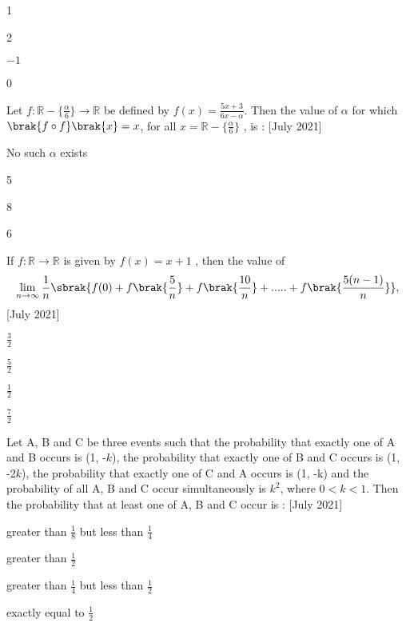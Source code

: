  \begin{enumerate}
 \begin{multicols}{2}
      \item 1
      \item 2
      \item  $-1$
      \item 0
 \end{multicols}
  \end{enumerate}
  \item Let $f : \mathbb{R} - \{ \frac{\alpha}{6} \} \to \mathbb{R}$ be defined by 
 $f(x) = \frac{5x + 3}{6x - \alpha}.$ Then the value of $\alpha$
 for which $\brak{f\circ f}\brak{x} = x$, for all $x = \mathbb{R} - \{ \frac{\alpha}{6} \}$
, is : \hfill[July 2021]
\begin{enumerate}
\begin{multicols}{2}
    \item No such $\alpha$ exists
    \item 5 
    \item 8
    \item 6
\end{multicols}
\end{enumerate}
    \item If $f : \mathbb{R} \to \mathbb{R}$ is given by $f(x) = x + 1$
, then the value of  \[\lim_{n\to\infty} \frac{1}{n} \sbrak{f(0) + f\brak{\frac{5}{n}} + f \brak{\frac{10}{n}} + ..... + f\brak{\frac{5(n - 1)}{n}}},\] \hfill[July 2021]
\begin{enumerate}
\begin{multicols}{4}
    \item $\frac{3}{2}$
    \item $\frac{5}{2}$
    \item $\frac{1}{2}$
    \item $\frac{7}{2}$
    \end{multicols}
\end{enumerate}
    \item Let A, B and C be three events such that the probability that exactly one of A and B occurs is (1, 
 -$k$), the probability that exactly one of B and C occurs is (1, -2$k$), the probability that exactly one of C and A occurs is (1, -k) and the probability of all A, B and C occur simultaneously is $k^2$, where $0 < k < 1$. Then the probability that at least one of A, B and C occur is : \hfill[July 2021]
 \begin{enumerate}
 \begin{multicols}{2}
     \item greater than $\frac{1}{8}$ but less than $\frac{1}{4}$
     \item greater than $\frac{1}{2}$
     \item greater than $\frac{1}{4}$ but less than $\frac{1}{2}$
     \item exactly equal to $\frac{1}{2}$
 \end{multicols}
 \end{enumerate}
